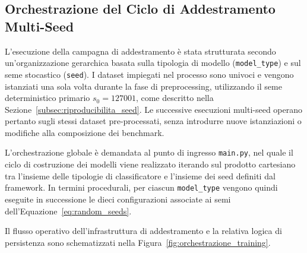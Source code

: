 \subsection{Orchestrazione del Ciclo di Addestramento Multi-Seed}
\label{subsec:orchestrazione_training}

L'esecuzione della campagna di addestramento è stata strutturata secondo un'organizzazione gerarchica basata sulla tipologia di modello (\texttt{model\_type}) e sul seme stocastico (\texttt{seed}). 
I dataset impiegati nel processo sono univoci e vengono istanziati una sola volta durante la fase di preprocessing, utilizzando il seme deterministico primario $s_0 = 127001$, come descritto nella Sezione~\ref{subsec:riproducibilita_seed}. 
Le successive esecuzioni multi-seed operano pertanto sugli stessi dataset pre-processati, senza introdurre nuove istanziazioni o modifiche alla composizione dei benchmark.

L'orchestrazione globale è demandata al punto di ingresso \texttt{main.py}, nel quale il ciclo di costruzione dei modelli viene realizzato iterando sul prodotto cartesiano tra l'insieme delle tipologie di classificatore e l'insieme dei seed definiti dal framework. 
In termini procedurali, per ciascun \texttt{model\_type} vengono quindi eseguite in successione le dieci configurazioni associate ai semi dell'Equazione~\eqref{eq:random_seeds}.

Il flusso operativo dell'infrastruttura di addestramento e la relativa logica di persistenza sono schematizzati nella Figura~\ref{fig:orchestrazione_training}.

